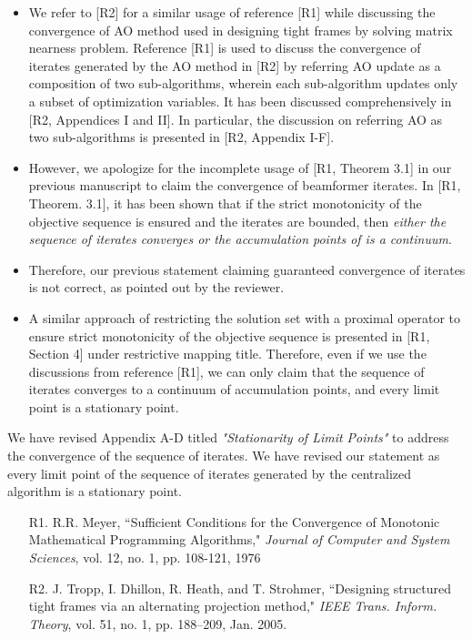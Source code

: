\begin{enumerate}
\begin{itemize}
	\item We refer to [R2] for a similar usage of reference [R1] while discussing the convergence of \ac{AO} method used in designing tight frames by solving matrix nearness problem. Reference [R1] is used to discuss the convergence of iterates generated by the \ac{AO} method in [R2] by referring \ac{AO} update as a composition of two sub-algorithms, wherein each sub-algorithm updates only a subset of optimization variables. It has been discussed comprehensively in [R2, Appendices I and II]. In particular, the discussion on referring \ac{AO} as two sub-algorithms is presented in [R2, Appendix I-F].
	\item However, we apologize for the incomplete usage of [R1, Theorem 3.1] in our previous manuscript to claim the convergence of beamformer iterates. In [R1, Theorem. 3.1], it has been shown that if the strict monotonicity of the objective sequence is ensured and the iterates are bounded, then \textit{either the sequence of iterates converges or the accumulation points of  is a continuum}.
	\item Therefore, our previous statement claiming guaranteed convergence of iterates is not correct, as pointed out by the reviewer. 
	\item A similar approach of restricting the solution set with a proximal operator to ensure strict monotonicity of the objective sequence is presented in [R1, Section 4] under restrictive mapping title. Therefore, even if we use the discussions from reference [R1], we can only claim that the sequence of iterates  converges to a continuum of accumulation points, and every limit point is a stationary point.
\end{itemize}

We have revised Appendix A-D titled \textit{"Stationarity of Limit Points"} to address the convergence of the sequence of iterates. We have revised our statement as every limit point of the sequence of iterates generated by the centralized algorithm is a stationary point.

\vspace{1eM}
\begin{itemize}		
	\item[R1.] R.R. Meyer, ``Sufficient Conditions for the Convergence of Monotonic Mathematical Programming Algorithms," \emph{Journal of Computer and System Sciences}, vol. 12, no. 1, pp. 108-121, 1976
	\item[R2.] J. Tropp, I. Dhillon, R. Heath, and T. Strohmer, ``Designing structured tight frames via an alternating projection method," \emph{IEEE Trans. Inform. Theory}, vol. 51, no. 1, pp. 188–209, Jan. 2005.
\end{itemize}

\end{enumerate}